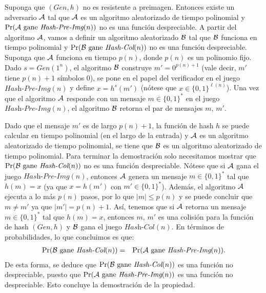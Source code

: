 \documentclass[11pt]{article}
\begin{document}
Suponga que $(\textit{Gen},h)$ no es resistente a preimagen. Entonces
existe un adversario ${\cal A}$ tal que ${\cal A}$ es un algoritmo
aleatorizado de tiempo polinomial y $\Pr({\cal A} \text{ gane }
\textit{Hash-Pre-Img}(n))$ no es una función despreciable. A partir
del algoritmo ${\cal A}$, vamos a definir un algoritmo aleatorizado
${\cal B}$ tal que ${\cal B}$ funciona en tiempo polinomial y
$\Pr({\cal B} \text{ gane } \textit{Hash-Col}(n))$ no es una función
despreciable. Suponga que ${\cal A}$ funciona en tiempo $p(n)$, donde
$p(n)$ es un polinomio fijo. Dado $s = \textit{Gen}(1^n)$, el
algoritmo ${\cal B}$ construye $m' = 0^{p(n)+1}$ (vale decir, $m'$
tiene $p(n)+1$ símbolos $0$), se pone en el papel del verificador en
el juego $\textit{Hash-Pre-Img}(n)$ y define $x = h^s(m')$ (nótese que
$x \in \{0,1\}^{\ell(n)}$). Una vez que el algoritmo ${\cal A}$
responde con un mensaje $m \in \{0,1\}^*$ en el juego
$\textit{Hash-Pre-Img}(n)$, el algoritmo ${\cal B}$ retorna el par de
mensajes $m$, $m'$.

Dado que el mensaje $m'$ es de largo $p(n)+1$, la función de hash $h$
se puede calcular en tiempo polinomial (en el largo de la entrada) y
${\cal A}$ es un algoritmo aleatorizado de tiempo polinomial, se tiene
que ${\cal B}$ es un algoritmo aleatorizado de tiempo
polinomial. Para terminar la demostración solo necesitamos
mostrar que $\Pr({\cal B} \text{ gane } \textit{Hash-Col}(n))$ no es
una función despreciable. Nótese que si ${\cal A}$ gana el juego
$\textit{Hash-Pre-Img}(n)$, entonces ${\cal A}$ genera un mensaje $m
\in \{0,1\}^*$ tal que $h(m) = x$ (ya que $x = h(m')$ con $m' \in
\{0,1\}^*$). Además, el algoritmo ${\cal A}$ ejecuta a lo más $p(n)$
pasos, por lo que $|m| \leq p(n)$ y se puede concluir que $m \neq m'$
ya que $|m'| = p(n)+1$. Así, tenemos que si ${\cal A}$ retorna un
mensaje $m \in \{0,1\}^*$ tal que $h(m) = x$, entonces $m$, $m'$ es
una colisión para la función de hash $(\textit{Gen},h)$ y ${\cal B}$
gana el juego $\textit{Hash-Col}(n)$. En términos de probabilidades,
lo que concluimos es que:
\begin{eqnarray*}
  \Pr({\cal B} \text{ gane } \textit{Hash-Col}(n)) &=& 
  \Pr({\cal A} \text{ gane } \textit{Hash-Pre-Img}(n)).
\end{eqnarray*}
De esta forma, se deduce que $\Pr({\cal B} \text{ gane } \textit{Hash-Col}(n))$ es una función no despreciable, puesto que 
  $\Pr({\cal A} \text{ gane } \textit{Hash-Pre-Img}(n))$ es una función no despreciable. Esto concluye
la demostración de la propiedad.
  
\end{document}
